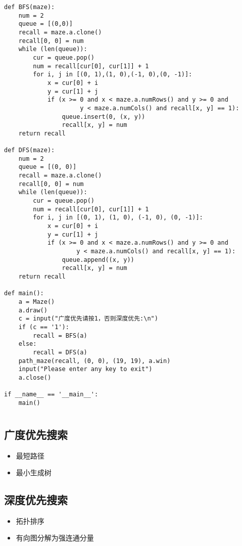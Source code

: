 \documentclass[12pt,a4paper]{article}
\begin{document}
\begin{verbatim}
def BFS(maze):
    num = 2
    queue = [(0,0)]
    recall = maze.a.clone()
    recall[0, 0] = num
    while (len(queue)):
        cur = queue.pop()
        num = recall[cur[0], cur[1]] + 1
        for i, j in [(0, 1),(1, 0),(-1, 0),(0, -1)]:
            x = cur[0] + i
            y = cur[1] + j
            if (x >= 0 and x < maze.a.numRows() and y >= 0 and
                     y < maze.a.numCols() and recall[x, y] == 1):
                queue.insert(0, (x, y))
                recall[x, y] = num
    return recall

def DFS(maze):
    num = 2
    queue = [(0, 0)]
    recall = maze.a.clone()
    recall[0, 0] = num
    while (len(queue)):
        cur = queue.pop()
        num = recall[cur[0], cur[1]] + 1
        for i, j in [(0, 1), (1, 0), (-1, 0), (0, -1)]:
            x = cur[0] + i
            y = cur[1] + j
            if (x >= 0 and x < maze.a.numRows() and y >= 0 and 
                    y < maze.a.numCols() and recall[x, y] == 1):
                queue.append((x, y))
                recall[x, y] = num
    return recall

def main():
    a = Maze()
    a.draw()
    c = input("广度优先请按1，否则深度优先:\n")
    if (c == '1'):
        recall = BFS(a)
    else:
        recall = DFS(a)
    path_maze(recall, (0, 0), (19, 19), a.win)
    input("Please enter any key to exit")
    a.close()

if __name__ == '__main__':
    main()
\end{verbatim}

\newpage
\section{\color[rgb]{0.2,0.4,0.6}{应用与拓展}}
\subsection{广度优先搜索}
\begin{itemize}
	\item 最短路径
	\item 最小生成树
\end{itemize}
\subsection{深度优先搜索}
\begin{itemize}
	\item 拓扑排序
	\item 有向图分解为强连通分量
\end{itemize}

\newpage
\nocite{*} %


\end{document}
